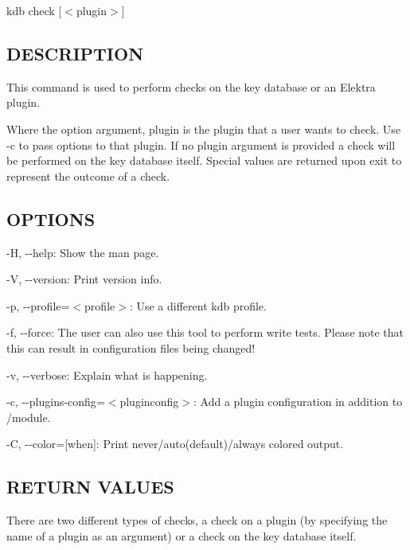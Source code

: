{\ttfamily kdb check \mbox{[}$<$plugin$>$\mbox{]}}

\subsection*{D\+E\+S\+C\+R\+I\+P\+T\+I\+O\+N}

This command is used to perform checks on the key database or an Elektra plugin.

Where the option argument, {\ttfamily plugin} is the plugin that a user wants to check. Use {\ttfamily -\/c} to pass options to that plugin. If no {\ttfamily plugin} argument is provided a check will be performed on the key database itself. Special values are returned upon exit to represent the outcome of a check.

\subsection*{O\+P\+T\+I\+O\+N\+S}


\begin{DoxyItemize}
\item {\ttfamily -\/\+H}, {\ttfamily -\/-\/help}\+: Show the man page.
\item {\ttfamily -\/\+V}, {\ttfamily -\/-\/version}\+: Print version info.
\item {\ttfamily -\/p}, {\ttfamily -\/-\/profile}=$<$profile$>$\+: Use a different kdb profile.
\item {\ttfamily -\/f}, {\ttfamily -\/-\/force}\+: The user can also use this tool to perform write tests. Please note that this can result in configuration files being changed!
\item {\ttfamily -\/v}, {\ttfamily -\/-\/verbose}\+: Explain what is happening.
\item {\ttfamily -\/c}, {\ttfamily -\/-\/plugins-\/config}=$<$pluginconfig$>$\+: Add a plugin configuration in addition to {\ttfamily /module}.
\item {\ttfamily -\/\+C}, {\ttfamily -\/-\/color}=\mbox{[}when\mbox{]}\+: Print never/auto(default)/always colored output.
\end{DoxyItemize}

\subsection*{R\+E\+T\+U\+R\+N V\+A\+L\+U\+E\+S}

There are two different types of checks, a check on a plugin (by specifying the name of a plugin as an argument) or a check on the key database itself.

